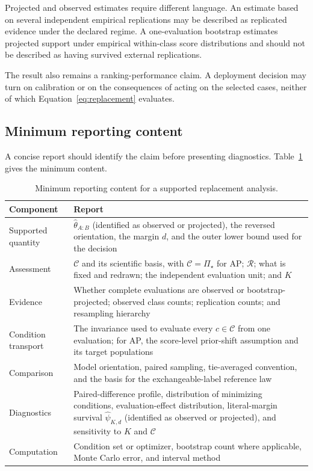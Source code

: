 \documentclass[11pt]{article}
\newcommand{\Regime}{\mathcal{R}}
\newcommand{\CSet}{\mathcal{C}}
\newcommand{\PSet}{\Pi_\star}
\theoremstyle{remark}
\begin{document}
Projected and observed estimates require different language. An estimate based on several independent empirical replications may be described as replicated evidence under the declared regime. A one-evaluation bootstrap estimates projected support under empirical within-class score distributions and should not be described as having survived external replications.

The result also remains a ranking-performance claim. A deployment decision may turn on calibration or on the consequences of acting on the selected cases, neither of which Equation~\eqref{eq:replacement} evaluates.

\subsection{Minimum reporting content}

A concise report should identify the claim before presenting diagnostics. Table~\ref{tab:reporting} gives the minimum content.

\begin{table}[ht]
\centering
\caption{Minimum reporting content for a supported replacement analysis.}
\label{tab:reporting}
\begin{tabularx}{\textwidth}{@{}p{}X@{}}
\toprule
Component & Report \\
\midrule
Supported quantity &
$\widehat\theta_{A:B}$ (identified as observed or projected), the reversed orientation, the margin $d$, and the outer lower bound used for the decision \\
Assessment &
$\CSet$ and its scientific basis, with $\CSet=\PSet$ for AP; $\Regime$; what is fixed and redrawn; the independent evaluation unit; and $K$ \\
Evidence &
Whether complete evaluations are observed or bootstrap-projected; observed class counts; replication counts; and resampling hierarchy \\
Condition transport &
The invariance used to evaluate every $c\in\CSet$ from one evaluation; for AP, the score-level prior-shift assumption and its target populations \\
Comparison &
Model orientation, paired sampling, tie-averaged convention, and the basis for the exchangeable-label reference law \\
Diagnostics &
Paired-difference profile, distribution of minimizing conditions, evaluation-effect distribution, literal-margin survival $\widehat\psi_{K,d}$ (identified as observed or projected), and sensitivity to $K$ and $\CSet$ \\
Computation &
Condition set or optimizer, bootstrap count where applicable, Monte Carlo error, and interval method \\
\bottomrule
\end{tabularx}
\end{table}
\end{document}
